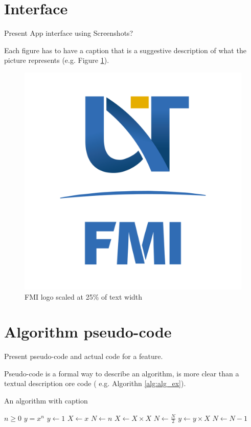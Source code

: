 \section{Interface}
Present App interface using Screenshots?

Each figure has to have a caption that is a suggestive description of what  the  picture represents (e.g. Figure \ref{fig:siglaUVT}).
\begin{figure}[!ht]
    \centering
    \includegraphics[width=0.25\linewidth]{FMI-03.png}
    \caption{ FMI logo scaled at 25\% of text width}
    \label{fig:siglaUVT}
\end{figure}

\section{Algorithm pseudo-code}
Present pseudo-code and actual code for a feature.

Pseudo-code is a formal way to describe an algorithm, is more clear than a textual description ore code ( e.g. Algorithn \ref{alg:alg_ex}).

\begin{algorithm}[!ht]
\caption{An algorithm with caption}\label{alg:alg_ex}
\begin{algorithmic}[1]
\Require $n \geq 0$
\Ensure $y = x^n$
\State $y \gets 1$
\State $X \gets x$
\State $N \gets n$
    \State $X \gets X \times X$
    \State $N \gets \frac{N}{2}$  
    \State $y \gets y \times X$
    \State $N \gets N - 1$
\EndIf
\EndWhile
\end{algorithmic}
\end{algorithm}

